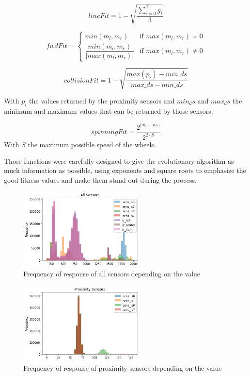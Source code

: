 \documentclass[lettersize,journal]{IEEEtran}
\begin{document}
\begin{equation}
\label{linef}
    lineFit = 1- \sqrt{\dfrac{\sum_{i=0}^{2} g_i}{3}}
\end{equation}

\begin{equation}
\label{forwardf}
fwdFit = \begin{cases} min(m_l,m_r) & \mbox{if $max(m_l,m_r) = 0$} \\[1em] \dfrac{min(m_l,m_r)}{|max(m_l,m_r)|} & \mbox{if $max(m_l,m_r) \neq 0$}
        \end{cases}
\end{equation}

\begin{equation}
\label{collisionf}
    collisionFit = 1 - \sqrt{\frac{max(p_i)-min\_ds}{max\_ds - min\_ds}}
\end{equation}

With $p_i$ the values returned by the proximity sensors and $min_ds$ and $max_ds$ the minimum and maximum values that can be returned by those sensors.

\begin{equation}
\label{spinningf}
    spinningFit = \frac{2^{|m_l-m_r|}}{2^{2\cdot S}}
\end{equation}
With $S$ the maximum possible speed of the wheels.
\par
Those functions were carefully designed to give the evolutionary algorithm as much information as possible, using exponents and square roots to emphasize the good fitness values and make them stand out during the process.
\begin{figure}[H]
\centering
\includegraphics[width=2.5in]{allSensors.png}
\caption{Frequency of response of all sensors depending on the value}
\label{allSensors}
\end{figure}

\begin{figure}[H]
\centering
\includegraphics[width=2.5in]{proximitySensors.png}
\caption{Frequency of response of proximity sensors depending on the value}
\label{irSensors}
\end{figure}
\end{document}
